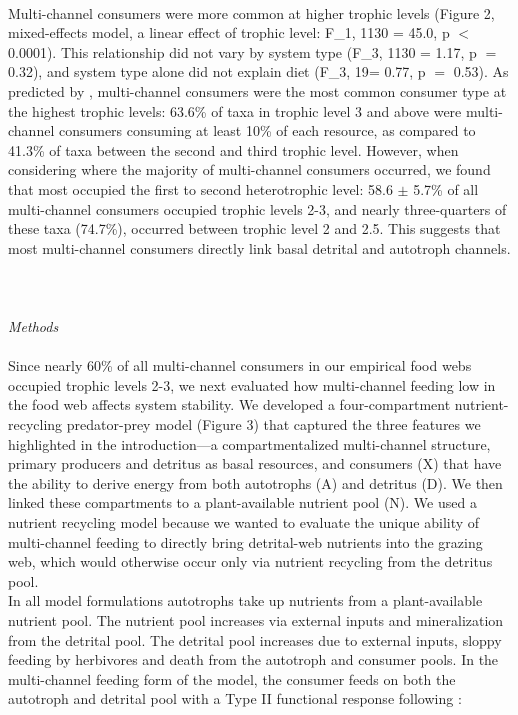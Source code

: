 \documentclass[12pt,a4paper,oneside]{article}
\begin{document}
\\
\indent Multi-channel consumers were more common at
higher trophic levels (Figure 2, mixed-effects model, a linear effect
of trophic level:
F_{1, 1130 }= 45.0, p \(<\) 0.0001). This relationship did not vary
by system type (F_{3, 1130 }= 1.17, p \(=\) 0.32), and system type
alone did not explain diet (F_{3, 19}=
0.77, p \(=\) 0.53). As predicted by \citet{Rooney:2006}, multi-channel consumers
were the most common consumer type at the highest trophic levels: 63.6\% of taxa
in trophic level 3 and above were multi-channel consumers consuming at
least 10\% of each resource, as compared to 41.3\% of taxa between the
second and third trophic level. However, when considering where the
majority of multi-channel consumers occurred, we found that most
occupied the first to second heterotrophic level: 58.6 ${\pm}$
5.7\% of all multi-channel consumers occupied trophic levels 2-3, and
nearly three-quarters of these taxa (74.7\%), occurred between trophic
level 2 and 2.5.
This suggests that most multi-channel consumers directly
link basal detrital and autotroph channels. 
\\
\\
\\
\\
\emph{Methods}\\
\\
\indent Since nearly 60\% of all multi-channel consumers in our
empirical food webs occupied
trophic levels 2-3, we next evaluated how multi-channel feeding low in the food
web affects system stability. We developed a four-compartment
nutrient-recycling predator-prey model (Figure 3) that captured the three features we highlighted in the introduction---a compartmentalized multi-channel structure, primary producers and detritus as basal resources, and consumers (X)
that have the ability to derive energy from both autotrophs (A) and detritus (D). We then linked these compartments to a
plant-available nutrient pool (N). We used a nutrient recycling model because we wanted to evaluate the unique ability of multi-channel feeding to directly bring detrital-web nutrients into the grazing web, which would otherwise occur only via nutrient recycling from the detritus pool. 
\\
\indent In all model formulations autotrophs take up nutrients from a
plant-available nutrient pool. The nutrient pool increases via external
inputs and mineralization from the detrital pool. The detrital pool
increases due to external inputs, sloppy feeding by herbivores and death
from the autotroph and consumer pools. In the multi-channel feeding form of
the model, the consumer feeds on both the autotroph and detrital pool with a Type II functional response
following \cite{Chesson:1983}:
\end{document}
